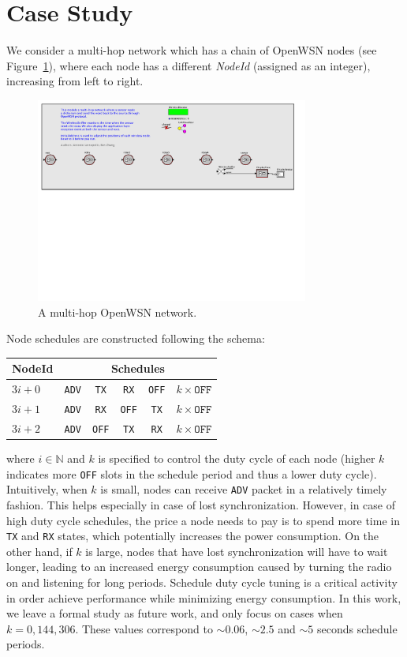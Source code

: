 \section{Case Study}
\label{sec:case-study}

We consider a multi-hop network which has a chain of OpenWSN nodes (see Figure~\ref{fig:multihop}), where each node has a different {\em NodeId} (assigned as an integer), increasing from left to right. 
\begin{figure}[t]
\centering
\includegraphics[width=0.8\textwidth]{figures/PaperDemoPtolemy}
\caption{A multi-hop OpenWSN network.}
\label{fig:multihop}
\end{figure}
Node schedules are constructed following the schema:

\begin{tabular}{ l | c | c | c | c | c }
  \hline                       
  NodeId & \multicolumn{5}{c}{Schedules} \\
  \hline
  $3i+0$ & \texttt{ADV} & \texttt{TX} & \texttt{RX} & \texttt{OFF} & $k \times \texttt{OFF}$ \\
  $3i+1$ & \texttt{ADV} & \texttt{RX} & \texttt{OFF} & \texttt{TX} & $k \times \texttt{OFF}$ \\
  $3i+2$ & \texttt{ADV} & \texttt{OFF} & \texttt{TX} & \texttt{RX} & $k \times \texttt{OFF}$ \\
  \hline  
\end{tabular}
where $i \in \mathbb{N}$ and $k$ is specified to control the duty cycle of each node (higher $k$ indicates more \texttt{OFF} slots in the schedule period and thus a lower duty cycle). Intuitively, when $k$ is small, nodes can receive \texttt{ADV} packet in a relatively timely fashion. This helps especially in case of lost synchronization. However, in case of high duty cycle schedules, the price a node needs to pay is to spend more time in \texttt{TX} and \texttt{RX} states, which potentially increases the power consumption. On the other hand, if $k$ is large, nodes that have lost synchronization will have to wait longer, leading to an increased energy consumption caused by turning the radio on and listening for long periods. Schedule duty cycle tuning is a critical activity in order achieve performance while minimizing energy consumption. In this work, we leave a formal study as future work, and only focus on cases when $k = 0, 144, 306$. These values correspond to $\sim0.06$, $\sim2.5$ and $\sim5$ seconds schedule periods. 

